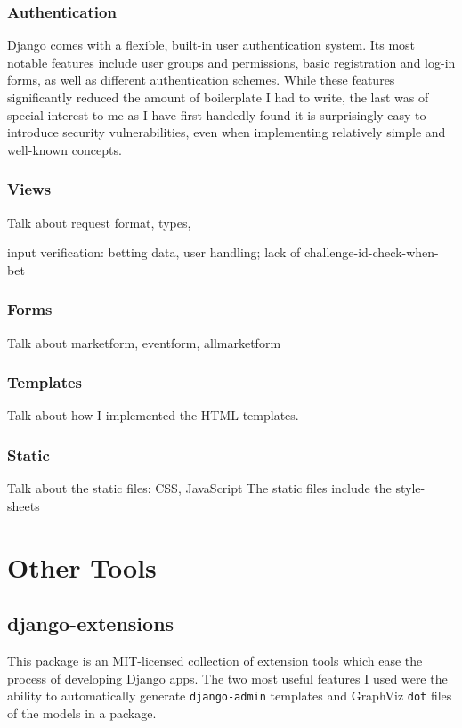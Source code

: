 \documentclass[bsc,frontabs,twoside,singlespacing,parskip,deptreport]{infthesis}     %
\begin{document}
\subsubsection{Authentication}

	Django comes with a flexible, built-in user authentication system. Its most notable features include user groups and permissions, basic registration and log-in forms, as well as different authentication schemes. While these features significantly reduced the amount of boilerplate I had to write, the last was of special interest to me as I have first-handedly found it is surprisingly easy to introduce security vulnerabilities, even when implementing relatively simple and well-known concepts. 

	


\subsubsection{Views}
Talk about request format, types, 

input verification: betting data, user handling; lack of challenge-id-check-when-bet

\subsubsection{Forms}
Talk about marketform, eventform, allmarketform

\subsubsection{Templates}
 Talk about how I implemented the HTML templates. 

\subsubsection{Static}
Talk about the static files: CSS, JavaScript
	The static files include the style-sheets 

\section{Other Tools}

\subsection{django-extensions}
    This package is an MIT-licensed collection of extension tools which ease the process of developing Django apps. The two most useful features I used were the ability to automatically generate {\tt django-admin} templates and GraphViz {\tt dot} files of the models in a package. 
\end{document}
